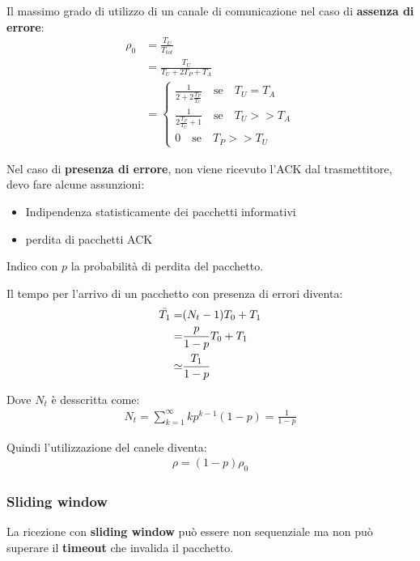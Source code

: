 Il massimo grado di utilizzo di un canale di comunicazione nel caso di \textbf{assenza di errore}:
\begin{align}
	\rho_0
	 & =\frac{T_U}{T_{tot}}                                                     \\
	 & = \frac{T_U}{T_U + 2T_P + T_A}                                           \\
	 & = \begin{cases}
		     \frac{1}{2 + 2 \frac{T_P}{T_U}} \quad \text{se}\quad T_U = T_A  \\
		     \frac{1}{2 \frac{T_P}{T_U} + 1} \quad \text{se}\quad T_U >> T_A \\
		     0 \quad \text{se}\quad T_P >> T_U
	     \end{cases}
\end{align}



Nel caso di \textbf{presenza di errore}, non viene ricevuto l'ACK dal trasmettitore, devo fare alcune assunzioni:
\begin{itemize}
	\item Indipendenza statisticamente dei pacchetti informativi
	\item perdita di pacchetti ACK
\end{itemize}

Indico con $p$ la probabilità di perdita del pacchetto.


Il tempo per l'arrivo di un pacchetto con presenza di errori diventa:
\begin{align}
	\Bar{T_1} = & (N_t - 1) T_0 + T_1     \\
	=           & \frac{p}{1-p} T_0 + T_1 \\
	\simeq      & \frac{T_1}{1-p}
\end{align}

Dove $N_t$ è desscritta come:
\begin{align}
	N_t = \sum_{k=1}^{\infty} k p^{k-1} (1-p) = \frac{1}{1-p}
\end{align}

Quindi l'utilizzazione del canele diventa:
\begin{align}
	\rho = (1 - p) \rho_0
\end{align}


\subsubsection{Sliding window}
La ricezione con \textbf{sliding window} può essere non sequenziale ma non può superare il \textbf{timeout} che invalida il pacchetto.

